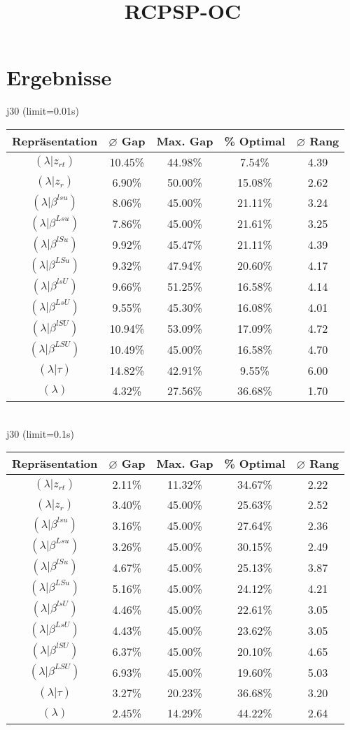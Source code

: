 \documentclass{scrartcl}
\title{RCPSP-OC}
\date{}
\begin{document}
\setlength\extrarowheight{5pt}
\section{Ergebnisse}
j30 (limit=0.01s)\\\begin{tabular}{ccccc}
\hline
Repräsentation & $\varnothing$ Gap & Max. Gap & \% Optimal & $\varnothing$ Rang\\[3pt]
\hline
$(\lambda|z_{rt})$&10.45\%&44.98\%&7.54\%&4.39\\
\hline
$(\lambda|z_r)$&6.90\%&50.00\%&15.08\%&2.62\\
\hline
$(\lambda|\beta^{lsu})$&8.06\%&45.00\%&21.11\%&3.24\\
\hline
$(\lambda|\beta^{Lsu})$&7.86\%&45.00\%&21.61\%&3.25\\
\hline
$(\lambda|\beta^{lSu})$&9.92\%&45.47\%&21.11\%&4.39\\
\hline
$(\lambda|\beta^{LSu})$&9.32\%&47.94\%&20.60\%&4.17\\
\hline
$(\lambda|\beta^{lsU})$&9.66\%&51.25\%&16.58\%&4.14\\
\hline
$(\lambda|\beta^{LsU})$&9.55\%&45.30\%&16.08\%&4.01\\
\hline
$(\lambda|\beta^{lSU})$&10.94\%&53.09\%&17.09\%&4.72\\
\hline
$(\lambda|\beta^{LSU})$&10.49\%&45.00\%&16.58\%&4.70\\
\hline
$(\lambda|\tau)$&14.82\%&42.91\%&9.55\%&6.00\\
\hline
$(\lambda)$&4.32\%&27.56\%&36.68\%&1.70\\\hline
\end{tabular}
\\[8pt]j30 (limit=0.1s)\\\begin{tabular}{ccccc}
\hline
Repräsentation & $\varnothing$ Gap & Max. Gap & \% Optimal & $\varnothing$ Rang\\[3pt]
\hline
$(\lambda|z_{rt})$&2.11\%&11.32\%&34.67\%&2.22\\
\hline
$(\lambda|z_r)$&3.40\%&45.00\%&25.63\%&2.52\\
\hline
$(\lambda|\beta^{lsu})$&3.16\%&45.00\%&27.64\%&2.36\\
\hline
$(\lambda|\beta^{Lsu})$&3.26\%&45.00\%&30.15\%&2.49\\
\hline
$(\lambda|\beta^{lSu})$&4.67\%&45.00\%&25.13\%&3.87\\
\hline
$(\lambda|\beta^{LSu})$&5.16\%&45.00\%&24.12\%&4.21\\
\hline
$(\lambda|\beta^{lsU})$&4.46\%&45.00\%&22.61\%&3.05\\
\hline
$(\lambda|\beta^{LsU})$&4.43\%&45.00\%&23.62\%&3.05\\
\hline
$(\lambda|\beta^{lSU})$&6.37\%&45.00\%&20.10\%&4.65\\
\hline
$(\lambda|\beta^{LSU})$&6.93\%&45.00\%&19.60\%&5.03\\
\hline
$(\lambda|\tau)$&3.27\%&20.23\%&36.68\%&3.20\\
\hline
$(\lambda)$&2.45\%&14.29\%&44.22\%&2.64\\\hline
\end{tabular}
\end{document}
